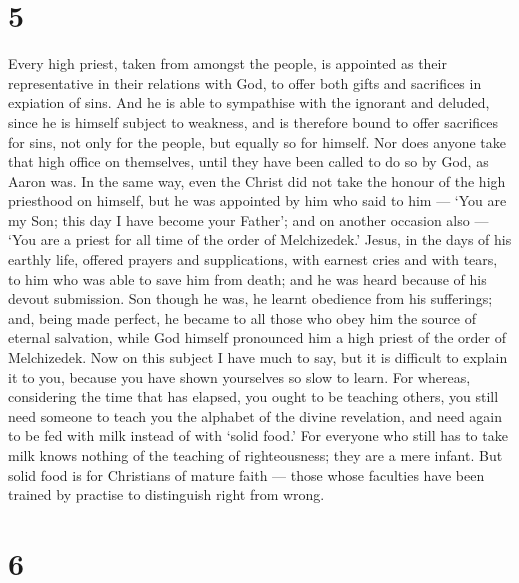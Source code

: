 \hypertarget{section-4}{%
\section{5}\label{section-4}}

 Every high priest, taken from amongst the people, is
appointed as their representative in their relations with God, to offer
both gifts and sacrifices in expiation of sins.  And he is
able to sympathise with the ignorant and deluded, since he is himself
subject to weakness,  and is therefore bound to offer
sacrifices for sins, not only for the people, but equally so for
himself.  Nor does anyone take that high office on
themselves, until they have been called to do so by God, as Aaron was.
 In the same way, even the Christ did not take the honour of
the high priesthood on himself, but he was appointed by him who said to
him --- `You are my Son; this day I have become your Father';
 and on another occasion also --- `You are a priest for all
time of the order of Melchizedek.'  Jesus, in the days of
his earthly life, offered prayers and supplications, with earnest cries
and with tears, to him who was able to save him from death; and he was
heard because of his devout submission.  Son though he was,
he learnt obedience from his sufferings;  and, being made
perfect, he became to all those who obey him the source of eternal
salvation,  while God himself pronounced him a high priest
of the order of Melchizedek.  Now on this subject I have
much to say, but it is difficult to explain it to you, because you have
shown yourselves so slow to learn.  For whereas,
considering the time that has elapsed, you ought to be teaching others,
you still need someone to teach you the alphabet of the divine
revelation, and need again to be fed with milk instead of with `solid
food.'  For everyone who still has to take milk knows
nothing of the teaching of righteousness; they are a mere infant.
 But solid food is for Christians of mature faith --- those
whose faculties have been trained by practise to distinguish right from
wrong.

\hypertarget{section-5}{%
\section{6}\label{section-5}}

